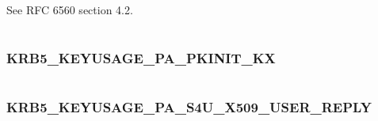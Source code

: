 \documentclass[letterpaper,10pt,english]{sphinxmanual}
\begin{document}
\begin{fulllineitems}
\label{appdev/refs/macros/KRB5_KEYUSAGE_PA_OTP_REQUEST:KRB5_KEYUSAGE_PA_OTP_REQUEST}
\end{fulllineitems}


See RFC 6560 section 4.2.

\begin{tabulary}{\linewidth}{|L|L|}
\hline

 & 
\\
\hline\end{tabulary}



\subsubsection{KRB5\_KEYUSAGE\_PA\_PKINIT\_KX}
\label{appdev/refs/macros/KRB5_KEYUSAGE_PA_PKINIT_KX::doc}\label{appdev/refs/macros/KRB5_KEYUSAGE_PA_PKINIT_KX:krb5-keyusage-pa-pkinit-kx-data}\label{appdev/refs/macros/KRB5_KEYUSAGE_PA_PKINIT_KX:krb5-keyusage-pa-pkinit-kx}

\begin{fulllineitems}
\label{appdev/refs/macros/KRB5_KEYUSAGE_PA_PKINIT_KX:KRB5_KEYUSAGE_PA_PKINIT_KX}
\end{fulllineitems}


\begin{tabulary}{\linewidth}{|L|L|}
\hline

 & 
\\
\hline\end{tabulary}



\subsubsection{KRB5\_KEYUSAGE\_PA\_S4U\_X509\_USER\_REPLY}
\label{appdev/refs/macros/KRB5_KEYUSAGE_PA_S4U_X509_USER_REPLY:krb5-keyusage-pa-s4u-x509-user-reply-data}\label{appdev/refs/macros/KRB5_KEYUSAGE_PA_S4U_X509_USER_REPLY:krb5-keyusage-pa-s4u-x509-user-reply}\label{appdev/refs/macros/KRB5_KEYUSAGE_PA_S4U_X509_USER_REPLY::doc}

\begin{fulllineitems}
\label{appdev/refs/macros/KRB5_KEYUSAGE_PA_S4U_X509_USER_REPLY:KRB5_KEYUSAGE_PA_S4U_X509_USER_REPLY}
\end{fulllineitems}
\end{document}
